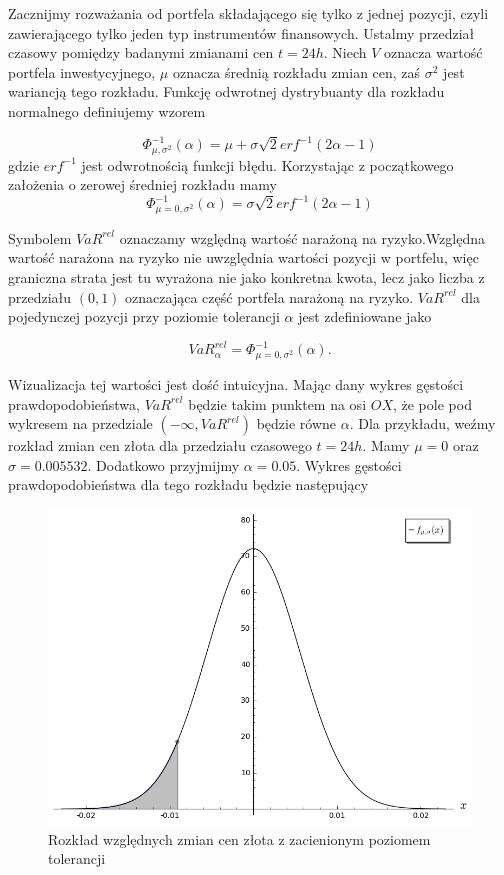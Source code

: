 \documentclass[11pt,titlepage]{article}
\begin{document}
Zacznijmy rozważania od portfela składającego się tylko z jednej pozycji, czyli zawierającego tylko jeden typ instrumentów finansowych. Ustalmy przedział czasowy pomiędzy badanymi zmianami cen $t=24h$. Niech $V$ oznacza wartość portfela inwestycyjnego, $\mu$ oznacza średnią rozkładu zmian cen, zaś $\sigma^{2}$ jest wariancją tego rozkładu. Funkcję odwrotnej dystrybuanty dla rozkładu normalnego definiujemy wzorem 





$$\Phi_{\mu,\sigma^{2}}^{-1}(\alpha)=\mu+\sigma \sqrt{2} erf^{-1}(2\alpha-1)$$
gdzie $erf^{-1}$ jest odwrotnością funkcji błędu. Korzystając z początkowego założenia o zerowej średniej rozkładu mamy
$$\Phi_{\mu=0,\sigma^{2}}^{-1}(\alpha)=\sigma \sqrt{2} erf^{-1}(2\alpha-1)$$



Symbolem $VaR^{rel}$ oznaczamy względną wartość narażoną na ryzyko.Względna wartość narażona na ryzyko nie uwzględnia wartości pozycji w portfelu, więc graniczna strata jest tu wyrażona nie jako konkretna kwota, lecz jako liczba z przedziału $(0,1)$ oznaczająca część portfela narażoną na ryzyko. $VaR^{rel}$ dla pojedynczej pozycji przy poziomie tolerancji $\alpha$ jest zdefiniowane jako

$$VaR_{\alpha}^{rel}   =\Phi_{\mu=0,\sigma^{2}}^{-1}(\alpha).$$

Wizualizacja tej wartości jest dość intuicyjna. Mając dany wykres gęstości prawdopodobieństwa, $VaR^{rel}$ będzie takim punktem na osi $OX$, że pole pod wykresem na przedziale $(-\infty,VaR^{rel})$  będzie równe $\alpha$. Dla przykładu, weźmy rozkład zmian cen złota dla przedziału czasowego $t=24h$. Mamy $\mu=0$ oraz $\sigma=0.005532$. Dodatkowo przyjmijmy $\alpha=0.05$. Wykres gęstości prawdopodobieństwa dla tego rozkładu będzie następujący

\begin{figure}[H]
\begin{center}
\includegraphics[scale=0.5]{chart1.png}
\end{center}
\caption{Rozkład względnych zmian cen złota z zacienionym poziomem tolerancji} \label{czynnosci_GD}
\end{figure} 
\end{document}
